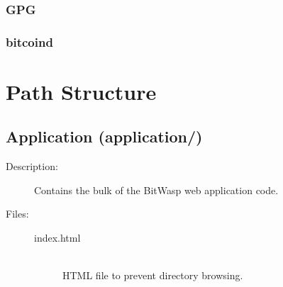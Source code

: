 \documentclass[11pt]{article} %
\begin{document}
\subsubsection{GPG}
\subsubsection{bitcoind}
\newpage

\section{Path Structure}
\subsection{Application (application/)}
\begin{description}
\item[Description:] Contains the bulk of the BitWasp web application code.
\item[Files:] \textbf{ }
\begin{description}
\item[index.html]  \textbf{ }\\
HTML file to prevent directory browsing.
\end{description} 
\end{description} 
\end{document}
